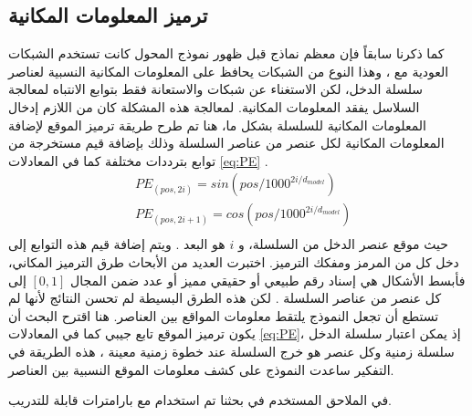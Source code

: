 \subsection{ترميز المعلومات المكانية
}
كما ذكرنا سابقاً فإن معظم نماذج
قبل ظهور نموذج المحول
كانت تستخدم الشبكات العودية
مع 
،
وهذا النوع من الشبكات يحافظ على المعلومات المكانية النسبية لعناصر سلسلة الدخل،  لكن الاستغناء عن شبكات 
والاستعانة فقط بتوابع الانتباه لمعالجة السلاسل يفقد المعلومات المكانية.
\newline
لمعالجة هذه المشكلة كان من اللازم إدخال المعلومات المكانية للسلسلة بشكل ما، هنا تم طرح طريقة ترميز الموقع لإضافة المعلومات المكانية لكل عنصر من عناصر السلسلة وذلك بإضافة قيم مستخرجة من توابع بترددات مختلفة كما في المعادلات 
\ref{eq:PE}
.
\begin{equation}
\begin{split}
	&PE_{(pos,2i)} = sin(pos/1000^{2i/d_{model}})\\
	&PE_{(pos,2i+1)} = cos(pos/1000^{2i/d_{model}})\\
\end{split}
\label{eq:PE}
\end{equation}
حيث 
موقع عنصر الدخل من السلسلة، و
$i$
هو البعد 
.
ويتم إضافة قيم هذه التوابع إلى دخل كل من المرمز ومفكك الترميز.
\newline
اختبرت العديد من الأبحاث طرق الترميز المكاني، فأبسط الأشكال هي إسناد رقم طبيعي أو حقيقي مميز أو عدد ضمن المجال
$[0,1]$
 إلى كل عنصر من عناصر السلسلة
.
\newline
لكن هذه الطرق البسيطة لم تحسن النتائج لأنها لم تستطع أن تجعل النموذج يلتقط معلومات المواقع بين العناصر.
هنا اقترح البحث 
أن يكون ترميز الموقع تابع جيبي كما في المعادلات 
\ref{eq:PE}،
إذ يمكن اعتبار  سلسلة الدخل سلسلة زمنية وكل عنصر هو خرج السلسلة عند خطوة زمنية معينة
،
هذه الطريقة في التفكير ساعدت النموذج على كشف معلومات الموقع النسبية بين العناصر.
 
في الملاحق المستخدم في بحثنا
تم استخدام 
مع بارامترات قابلة للتدريب.
